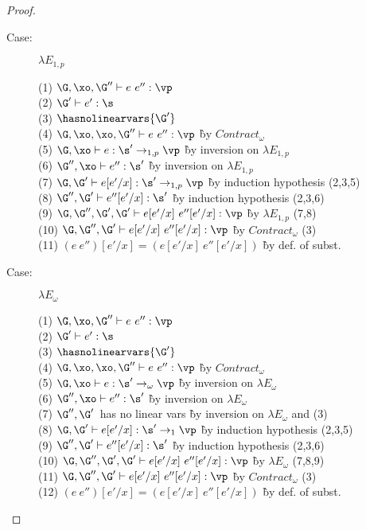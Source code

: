 \begin{proof}
\begin{description}
\item[Case:] $\lambda E_{1,p}$
\begin{tabbing}
  (1) $\G, \xo, \G'' \vdash e~e'' : \vp$\\
  (2) $\G' \vdash e' : \s$\\
  (3) $\hasnolinearvars{\G'}$\\
  (4) $\G, \xo, \xo, \G'' \vdash e~e'' : \vp$ \` by $Contract_\omega$\\
  (5) $\G, \xo \vdash e : \s'\to_{1,p}\vp$ \` by inversion on $\lambda E_{1,p}$\\
  (6) $\G'', \xo \vdash e'' : \s'$ \` by inversion on $\lambda E_{1,p}$\\
  (7) $\G, \G' \vdash e[e'/x] : \s'\to_{1,p}\vp$ \` by induction hypothesis (2,3,5)\\
  (8) $\G'', \G' \vdash e''[e'/x] : \s'$ \` by induction hypothesis (2,3,6)\\
  (9) $\G, \G'', \G', \G' \vdash e[e'/x]~e''[e'/x] : \vp$ \` by $\lambda E_{1,p}$ (7,8)\\
  (10) $\G, \G'', \G' \vdash e[e'/x]~e''[e'/x] : \vp$ \` by $Contract_\omega$ (3)\\
  (11) $(e~e'')[e'/x] = (e[e'/x]~e''[e'/x])$ \` by def. of subst.\\
\end{tabbing}

\item[Case:] $\lambda E_\omega$
\begin{tabbing}
    (1) $\G, \xo, \G'' \vdash e~e'' : \vp$\\
    (2) $\G' \vdash e' : \s$\\
    (3) $\hasnolinearvars{\G'}$\\
    (4) $\G, \xo, \xo, \G'' \vdash e~e'' : \vp$ \` by $Contract_\omega$\\
    (5) $\G, \xo \vdash e : \s'\to_\omega\vp$ \` by inversion on $\lambda E_\omega$\\
    (6) $\G'', \xo \vdash e'' : \s'$ \` by inversion on $\lambda E_\omega$\\
    (7) $\G'', \G'$~\textrm{has no linear vars} \` by inversion on $\lambda E_\omega$ and (3)\\
    (8) $\G, \G' \vdash e[e'/x] : \s'\to_1\vp$ \` by induction hypothesis (2,3,5)\\
    (9) $\G'', \G' \vdash e''[e'/x] : \s'$ \` by induction hypothesis (2,3,6)\\
    (10) $\G, \G'', \G', \G' \vdash e[e'/x]~e''[e'/x] : \vp$ \` by $\lambda E_\omega$ (7,8,9)\\
    (11) $\G, \G'', \G' \vdash e[e'/x]~e''[e'/x] : \vp$ \` by $Contract_\omega$ (3)\\
    (12) $(e~e'')[e'/x] = (e[e'/x]~e''[e'/x])$ \` by def. of subst.\\
\end{tabbing}


\end{description}
\end{proof}

